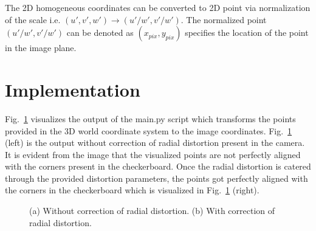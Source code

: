 \documentclass[a4paper, twoside, english]{article}
\begin{document}
The 2D homogeneous coordinates can be converted to 2D point via normalization of the scale i.e. $(u',v',w') \to (u'/w', v'/w')$. The normalized point $(u'/w', v'/w')$ can be denoted as $(x_{pix}, y_{pix})$ specifies the location of the point in the image plane.

\section{Implementation}

Fig.~\ref{fig:pointProjection} visualizes the output of the main.py script which transforms the points provided in the 3D world coordinate system to the image coordinates. 
Fig.~\ref{fig:pointProjection} (left) is the output without correction of radial distortion present in the camera. It is evident from the image that the visualized points are not perfectly aligned with the corners present in the checkerboard.
Once the radial distortion is catered through the provided distortion parameters, the points got perfectly aligned with the corners in the checkerboard which is visualized in Fig.~\ref{fig:pointProjection} (right).

\begin{figure}[h]
 \centerline
 {
  \qquad
 }
 \caption[3D Point Projection]{(a) Without correction of radial distortion. (b) With correction of radial distortion.}
 \label{fig:pointProjection}
\end{figure}



\end{document}
